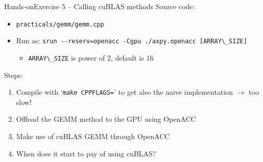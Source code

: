 \documentclass[12pt,aspectratio=169]{beamer}
\newcommand\shinline[2][]{\lstinline[style=shstyle,basicstyle=\ttfamily,#1]!#2!}
\begin{document}


\begin{frame}[fragile]{Hands-on}{Exercise 5 -- Calling cuBLAS methods}
  Source code:
  \begin{itemize}
  \item \shinline{practicals/gemm/gemm.cpp}
  \item Run as: \shinline{srun --reserv=openacc -Cgpu ./axpy.openacc [ARRAY\_SIZE]}
    \begin{itemize}
    \item \shinline{ARRAY\_SIZE} is power of 2, default is 16
    \end{itemize}
  \end{itemize}
  \vfill
  Steps:
  \begin{enumerate}
  \item Compile with `\shinline{make CPPFLAGS=}' to get also the naive implementation $\rightarrow$ too slow!
  \item Offload the GEMM method to the GPU using OpenACC
  \item Make use of cuBLAS GEMM through OpenACC
  \item When does it start to pay of using cuBLAS?
  \end{enumerate}
\end{frame}
\end{document}
